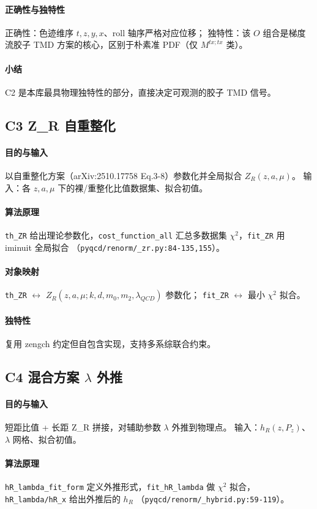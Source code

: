 \documentclass[UTF8]{ctexart}
\begin{document}
\paragraph{正确性与独特性} 正确性：色迹维序 $t,z,y,x$、roll 轴序严格对应位移；
独特性：该 $O$ 组合是梯度流胶子 TMD 方案的核心，区别于朴素准 PDF（仅 $M^{tx;tx}$ 类）。
\paragraph{小结} C2 是本库最具物理独特性的部分，直接决定可观测的胶子 TMD 信号。

\subsection{C3 Z\_R 自重整化}
\paragraph{目的与输入} 以自重整化方案（arXiv:2510.17758 Eq.3-8）参数化并全局拟合 $Z_R(z,a,\mu)$。
输入：各 $z,a,\mu$ 下的裸/重整化比值数据集、拟合初值。
\paragraph{算法原理} \texttt{th\_ZR} 给出理论参数化，\texttt{cost\_function\_all}
汇总多数据集 $\chi^2$，\texttt{fit\_ZR} 用 iminuit 全局拟合
（\textcolor{evidence}{\texttt{\nolinkurl{pyqcd/renorm/_zr.py:84-135,155}}}）。
\paragraph{对象映射} \texttt{th\_ZR} $\leftrightarrow$ $Z_R(z,a,\mu;k,d,m_0,m_2,\lambda_{QCD})$ 参数化；
\texttt{fit\_ZR} $\leftrightarrow$ 最小 $\chi^2$ 拟合。
\paragraph{独特性} 复用 zengch 约定但自包含实现，支持多系综联合约束。

\subsection{C4 混合方案 $\lambda$ 外推}
\paragraph{目的与输入} 短距比值 + 长距 Z\_R 拼接，对辅助参数 $\lambda$ 外推到物理点。
输入：$h_R(z,P_z)$、$\lambda$ 网格、拟合初值。
\paragraph{算法原理} \texttt{hR\_lambda\_fit\_form} 定义外推形式，\texttt{fit\_hR\_lambda}
做 $\chi^2$ 拟合，\texttt{hR\_lambda/hR\_x} 给出外推后的 $h_R$
（\textcolor{evidence}{\texttt{\nolinkurl{pyqcd/renorm/_hybrid.py:59-119}}}）。
\end{document}
